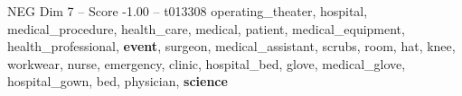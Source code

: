 \begin{textsample}{NEG Dim 7 – Score -1.00 – t013308}  \label{ex:f7_neg_019}
operating\_theater, hospital, medical\_procedure, health\_care, medical, patient, medical\_equipment, health\_professional, \textbf{event}, surgeon, medical\_assistant, scrubs, room, hat, knee, workwear, nurse, emergency, clinic, hospital\_bed, glove, medical\_glove, hospital\_gown, bed, physician, \textbf{science}

\end{textsample}
